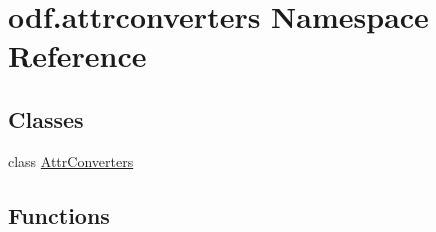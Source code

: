 \hypertarget{namespaceodf_1_1attrconverters}{\section{odf.\+attrconverters Namespace Reference}
\label{namespaceodf_1_1attrconverters}
}
\subsection*{Classes}
\begin{DoxyCompactItemize}
\item 
class \hyperlink{classodf_1_1attrconverters_1_1AttrConverters}{Attr\+Converters}
\end{DoxyCompactItemize}
\subsection*{Functions}
